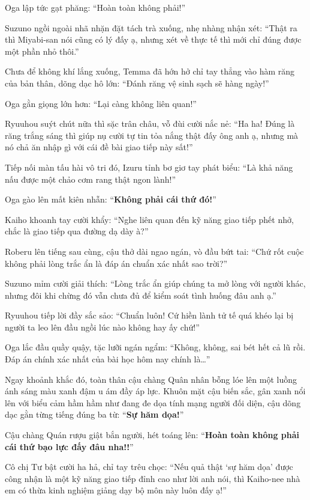 \documentclass[../main.tex]{subfiles}
\begin{document}
Oga lập tức gạt phăng: ``Hoàn toàn không phải!''

Suzuno ngồi ngoài nhã nhặn đặt tách trà xuống, nhẹ nhàng nhận xét: ``Thật ra thì Miyabi-san nói cũng có lý đấy ạ, nhưng xét về thực tế thì mới chỉ đúng được một phần nhỏ thôi.''

Chưa để không khí lắng xuống, Temma đã hớn hở chỉ tay thẳng vào hàm răng của bản thân, dõng dạc hô lớn: ``Đánh răng vệ sinh sạch sẽ hàng ngày!''

Oga gằn giọng lớn hơn: ``Lại càng không liên quan!''

Ryuuhou suýt chút nữa thì sặc trân châu, vỗ đùi cười nắc nẻ: ``Ha ha! Đúng là răng trắng sáng thì giúp nụ cười tự tin tỏa nắng thật đấy ông anh ạ, nhưng mà nó chả ăn nhập gì với cái đề bài giao tiếp này sất!''

Tiếp nối màn tấu hài vô tri đó, Izuru tỉnh bơ giơ tay phát biểu: ``Là khả năng nấu được một chảo cơm rang thật ngon lành!''

Oga gào lên mất kiên nhẫn: ``\textbf{Không phải cái thứ đó!}''

Kaiho khoanh tay cười khẩy: ``Nghe liên quan đến kỹ năng giao tiếp phết nhở, chắc là giao tiếp qua đường dạ dày à?''

Roberu lên tiếng sau cùng, cậu thở dài ngao ngán, vò đầu bứt tai: ``Chứ rốt cuộc không phải lòng trắc ẩn là đáp án chuẩn xác nhất sao trời?''

Suzuno mỉm cười giải thích: ``Lòng trắc ẩn giúp chúng ta mở lòng với người khác, nhưng đôi khi chừng đó vẫn chưa đủ để kiểm soát tình huống đâu anh ạ.''

Ryuuhou tiếp lời đầy sắc sảo: ``Chuẩn luôn! Cứ hiền lành tử tế quá khéo lại bị người ta leo lên đầu ngồi lúc nào không hay ấy chứ!''

Oga lắc đầu quầy quậy, tặc lưỡi ngán ngẩm: ``Không, không, sai bét hết cả lũ rồi. Đáp án chính xác nhất của bài học hôm nay chính là\dots''

Ngay khoảnh khắc đó, toàn thân cậu chàng Quân nhân bỗng lóe lên một luồng ánh sáng màu xanh đậm u ám đầy áp lực. Khuôn mặt cậu biến sắc, gân xanh nổi lên với biểu cảm hầm hầm như đang đe dọa tính mạng người đối diện, cậu dõng dạc gằn từng tiếng đúng ba từ: ``\textbf{Sự hăm dọa!}''


Cậu chàng Quán rượu giật bắn người, hét toáng lên: ``\textbf{Hoàn toàn không phải cái thứ bạo lực đấy đâu nha!!}''

Cô chị Tư bật cười ha hả, chỉ tay trêu chọc: ``Nếu quả thật `sự hăm dọa' được công nhận là một kỹ năng giao tiếp đỉnh cao như lời anh nói, thì Kaiho-nee nhà em có thừa kinh nghiệm giảng dạy bộ môn này luôn đấy ạ!''
\end{document}
